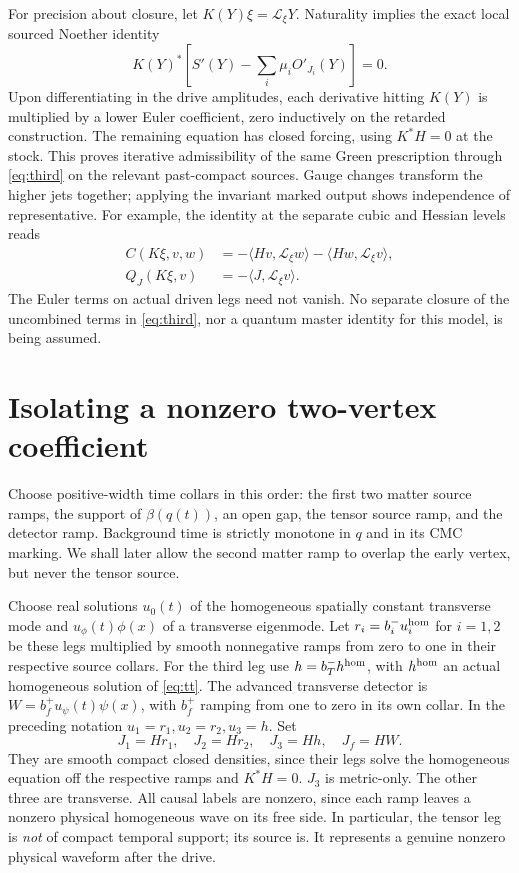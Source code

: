 \documentclass[11pt]{article}
\newcommand{\Lie}{\mathcal L}
\numberwithin{equation}{section}
\begin{document}
For precision about closure, let $K(Y)\xi=\Lie_\xi Y$. Naturality implies the exact local sourced Noether identity
\[
 K(Y)^*\left[S'(Y)-\sum_i\mu_i O'_{J_i}(Y)\right]=0 .
\]
Upon differentiating in the drive amplitudes, each derivative hitting $K(Y)$ is multiplied by a lower Euler coefficient, zero inductively on the retarded construction. The remaining equation has closed forcing, using $K^*H=0$ at the stock. This proves iterative admissibility of the same Green prescription through \eqref{eq:third} on the relevant past-compact sources. Gauge changes transform the higher jets together; applying the invariant marked output shows independence of representative. For example, the identity at the separate cubic and Hessian levels reads
\begin{equation}
 \begin{split}
 C(K\xi,v,w)&=-\langle Hv,\Lie_\xi w\rangle
               -\langle Hw,\Lie_\xi v\rangle,\\
 Q_J(K\xi,v)&=-\langle J,\Lie_\xi v\rangle .
 \end{split}
 \label{eq:ward}
\end{equation}
The Euler terms on actual driven legs need not vanish. No separate closure of the uncombined terms in \eqref{eq:third}, nor a quantum master identity for this model, is being assumed.

\section{Isolating a nonzero two-vertex coefficient}\label{sec:nonzero}

Choose positive-width time collars in this order: the first two matter source ramps, the support of $\beta(q(t))$, an open gap, the tensor source ramp, and the detector ramp. Background time is strictly monotone in $q$ and in its CMC marking. We shall later allow the second matter ramp to overlap the early vertex, but never the tensor source.

Choose real solutions $u_0(t)$ of the homogeneous spatially constant transverse mode and $u_\phi(t)\phi(x)$ of a transverse eigenmode. Let $r_i=b_i^-u_i^{\rm hom}$ for $i=1,2$ be these legs multiplied by smooth nonnegative ramps from zero to one in their respective source collars. For the third leg use $h=b_T^-h^{\rm hom}$, with $h^{\rm hom}$ an actual homogeneous solution of \eqref{eq:tt}. The advanced transverse detector is $W=b_f^+u_\psi(t)\psi(x)$, with $b_f^+$ ramping from one to zero in its own collar. In the preceding notation $u_1=r_1,u_2=r_2,u_3=h$. Set
\begin{equation}
      J_1=Hr_1,\quad J_2=Hr_2,\quad J_3=Hh,\quad J_f=HW .
 \label{eq:currents}
\end{equation}
They are smooth compact closed densities, since their legs solve the homogeneous equation off the respective ramps and $K^*H=0$. $J_3$ is metric-only. The other three are transverse. All causal labels are nonzero, since each ramp leaves a nonzero physical homogeneous wave on its free side. In particular, the tensor leg is \emph{not} of compact temporal support; its source is. It represents a genuine nonzero physical waveform after the drive.
\end{document}
